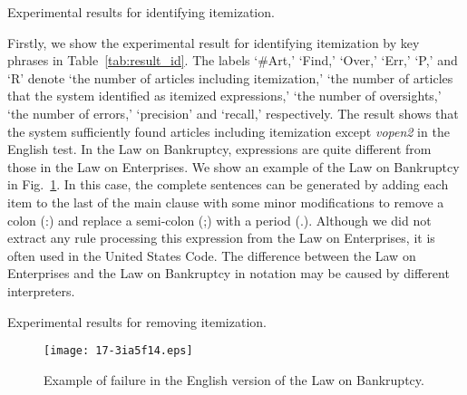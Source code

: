 \documentclass[english]{jnlp_1.4}
\begin{document}
\begin{table}[b]
\caption{Experimental results for identifying itemization.}
\label{tab:result_id}

\end{table}


Firstly, we show the experimental result for identifying itemization by key
phrases in Table~\ref{tab:result_id}.
The labels `\#Art,' `Find,' `Over,' `Err,' `P,' and `R' denote `the
number of articles including itemization,' `the number of articles that
the system identified as itemized expressions,' `the number of
oversights,' `the number of errors,' `precision' and `recall,' respectively.
The result shows that the system sufficiently found articles including
itemization except {\it vopen2} in the English test.
In the Law on Bankruptcy, expressions are quite different from those in the
Law on Enterprises.
We show an example of the Law on Bankruptcy in Fig.~\ref{fig:err_open2_english}.
In this case, the complete sentences can be generated by adding each
item to the last of the main clause with some minor modifications to remove
a colon (:) and replace a semi-colon (;) with a period (.).
Although we did not extract any rule processing this expression from the
Law on Enterprises, it is often used in the United States Code.
The difference between the Law on Enterprises and the Law on Bankruptcy in
notation may be caused by different interpreters.

\begin{table}[t]
\caption{Experimental results for removing itemization.}
\label{tab:result_rm}

\end{table}
\begin{figure}[t]
\begin{center}
\texttt{[image: 17-3ia5f14.eps]}
\end{center}
\caption{Example of failure in the English version of the Law on Bankruptcy.}
\label{fig:err_open2_english}
\end{figure}
\end{document}

